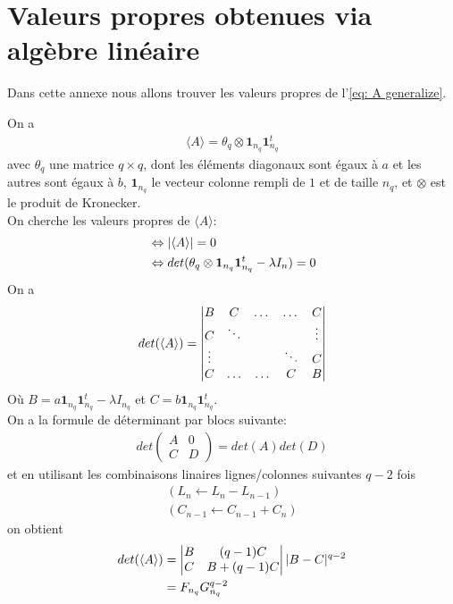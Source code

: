 \section{Valeurs propres obtenues via algèbre linéaire}
Dans cette annexe nous allons trouver les valeurs propres de l'\autoref{eq: A generalize}.

On a 
\begin{align*}
	\langle A \rangle = \theta_q \otimes \mathbf{1}_{n_q} \mathbf{1}_{n_q}^t
\end{align*}
avec $\theta_q$ une matrice $q \times q$, dont les éléments diagonaux sont égaux à $a$ et les autres sont égaux à $b$, $\mathbf{1}_{n_q}$ le vecteur colonne rempli de $1$ et de taille $n_q$, et $\otimes$ est le produit de Kronecker.\\
On cherche les valeurs propres de $\langle A \rangle$: 
\begin{align*}
	&\Leftrightarrow 
		|\langle A \rangle| = 0\\
	&\Leftrightarrow 
		det(\theta_q \otimes \mathbf{1}_{n_q} \mathbf{1}_{n_q}^t - \lambda I_n) = 0
\end{align*}
On a 
\begin{align*}
	det(\langle A \rangle) &= 
\begin{vmatrix}
B & C &  \dots & \dots & C \\ 
C & \ddots &  & & \vdots \\ 
\vdots &  &  & \ddots & C \\ 
C & \ldots & \ldots & C & B
\end{vmatrix} \\
\end{align*}
Où $B = a\mathbf{1}_{n_q} \mathbf{1}_{n_q}^t - \lambda I_{n_q}$ et $C = b \mathbf{1}_{n_q} \mathbf{1}_{n_q}^t$.\\

On a la formule de déterminant par blocs suivante: 
\begin{align*}
det \left(\begin{matrix} A & 0 \\ C & D \end{matrix} \right) = det(A)det(D)
\end{align*}
et en utilisant les combinaisons linaires lignes/colonnes suivantes $q-2$ fois
\begin{align}\label{eq: matrix method}
	(L_n \leftarrow L_n  - L_{n-1}) \\
	(C_{n-1} \leftarrow C_{n-1}  + C_n) \nonumber
\end{align}
on obtient
\begin{align*}
	det(\langle A \rangle ) &= 
	\begin{vmatrix}
	B & (q-1)C\\
	C & B + (q-1)C
	\end{vmatrix}
	| B - C |^{q-2} \\
	 &= F_{n_q}G_{n_q}^{q-2}
\end{align*}

